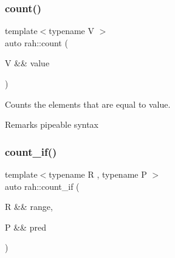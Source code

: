 \begin{DoxyCodeInclude}{0}
\end{DoxyCodeInclude}
\mbox{\label{namespacerah_ae8400202fc4005dbade0f479dd556ec3}} 
\subsubsection{\texorpdfstring{count()}{count()}\hspace{0.1cm}{\footnotesize\ttfamily [2/2]}}
{\footnotesize\ttfamily template$<$typename V $>$ \\
auto rah\+::count (\begin{DoxyParamCaption}\item[{V \&\&}]{value }\end{DoxyParamCaption})}



Counts the elements that are equal to value. 

\begin{DoxyRemark}{Remarks}
pipeable syntax
\end{DoxyRemark}

\begin{DoxyCodeInclude}{0}
\end{DoxyCodeInclude}
\mbox{\label{namespacerah_a8e6a379c05d482a52137f5647783fe27}} 
\subsubsection{\texorpdfstring{count\_if()}{count\_if()}\hspace{0.1cm}{\footnotesize\ttfamily [1/2]}}
{\footnotesize\ttfamily template$<$typename R , typename P $>$ \\
auto rah\+::count\+\_\+if (\begin{DoxyParamCaption}\item[{R \&\&}]{range,  }\item[{P \&\&}]{pred }\end{DoxyParamCaption})}



